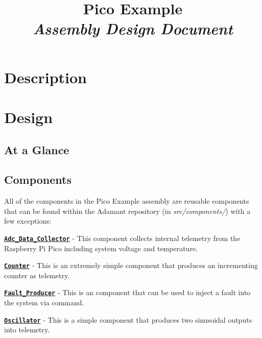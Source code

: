 



\title{\textbf{Pico Example} \\
\large\textit{Assembly Design Document}}
\date{}
\maketitle

\section{Description}


\section{Design}

\subsection{At a Glance}


\subsection{Components}
All of the components in the Pico Example assembly are reusable components that can be found within the Adamant repository (in \textit{src/components/}) with a few exceptions:

\vspace{5mm} %
\begin{spaceditemize}
  \item \textbf{\texttt{\url{Adc_Data_Collector}}} - This component collects internal telemetry from the Raspberry Pi Pico including system voltage and temperature.
  \item \textbf{\texttt{\url{Counter}}} - This is an extremely simple component that produces an incrementing counter as telemetry.
  \item \textbf{\texttt{\url{Fault_Producer}}} - This is an component that can be used to inject a fault into the system via command.
  \item \textbf{\texttt{\url{Oscillator}}} - This is a simple component that produces two sinusoidal outputs into telemetry. 
\end{spaceditemize}
\vspace{5mm} %

